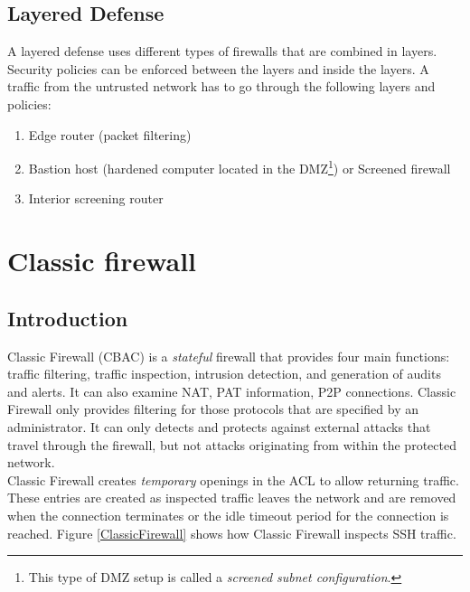 \subsection{Layered Defense}

A layered defense uses different types of firewalls that are combined in layers. Security policies can be enforced between the layers and inside the layers. A traffic from the untrusted network has to go through the following layers and policies:

\begin{enumerate}
\item Edge router (packet filtering)
\item Bastion host (hardened computer located in the DMZ\footnote{This type of DMZ setup is called a \emph{screened subnet configuration}.}) or Screened firewall
\item Interior screening router
\end{enumerate}

\section{Classic firewall}\label{sec:ClassicFirewall}

\subsection{Introduction}

Classic Firewall (CBAC) is a \emph{stateful} firewall that provides four main functions: traffic filtering, traffic inspection, intrusion detection, and generation of audits and alerts. It can also examine NAT, PAT information, P2P connections. Classic Firewall only provides filtering for those protocols that are specified by an administrator. It can only detects and protects against external attacks that travel through the firewall, but not attacks originating from within the protected network. \\

Classic Firewall creates \emph{temporary} openings in the ACL to allow returning traffic. These entries are created as inspected traffic leaves the network and are removed when the connection terminates or the idle timeout period for the connection is reached. Figure \ref{ClassicFirewall} shows how Classic Firewall inspects SSH traffic.

